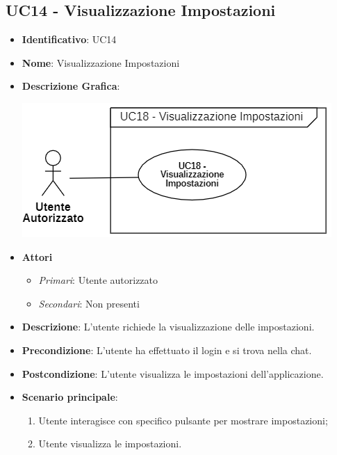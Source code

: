 \subsection{UC14 - Visualizzazione Impostazioni}
\begin{itemize}
	\item \textbf{Identificativo}: UC14
	\item \textbf{Nome}: Visualizzazione Impostazioni
	\item\textbf{Descrizione Grafica}: 
	\begin{center}
		\includegraphics[scale=0.80]{images/UC14.png} 
	\end{center}

	\item \textbf{Attori}
	\begin{itemize} 
		\item \textit{Primari}: Utente autorizzato
		\item \textit{Secondari}: Non presenti
	\end{itemize}
	\item \textbf{Descrizione}: L'utente richiede la visualizzazione delle impostazioni.
	\item \textbf{Precondizione}: L'utente ha effettuato il login e si trova nella chat.
	\item \textbf{Postcondizione}: L'utente visualizza le impostazioni dell'applicazione.
	\item \textbf{Scenario principale}: \begin{enumerate}
		\item Utente interagisce con specifico pulsante per mostrare impostazioni;
		\item Utente visualizza le impostazioni.
	\end{enumerate}
\end{itemize}